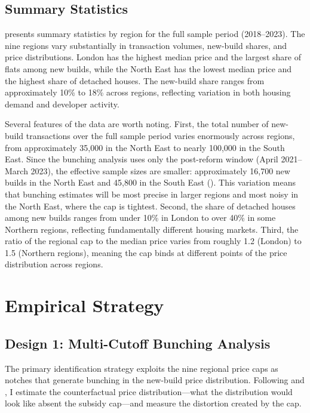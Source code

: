 \documentclass[12pt]{article}
\begin{document}
\subsection{Summary Statistics}



 presents summary statistics by region for the full sample period (2018--2023). The nine regions vary substantially in transaction volumes, new-build shares, and price distributions. London has the highest median price and the largest share of flats among new builds, while the North East has the lowest median price and the highest share of detached houses. The new-build share ranges from approximately 10\% to 18\% across regions, reflecting variation in both housing demand and developer activity.

Several features of the data are worth noting. First, the total number of new-build transactions over the full sample period varies enormously across regions, from approximately 35,000 in the North East to nearly 100,000 in the South East. Since the bunching analysis uses only the post-reform window (April 2021--March 2023), the effective sample sizes are smaller: approximately 16,700 new builds in the North East and 45,800 in the South East (). This variation means that bunching estimates will be most precise in larger regions and most noisy in the North East, where the cap is tightest. Second, the share of detached houses among new builds ranges from under 10\% in London to over 40\% in some Northern regions, reflecting fundamentally different housing markets. Third, the ratio of the regional cap to the median price varies from roughly 1.2 (London) to 1.5 (Northern regions), meaning the cap binds at different points of the price distribution across regions.


\section{Empirical Strategy}\label{sec:strategy}

\subsection{Design 1: Multi-Cutoff Bunching Analysis}

The primary identification strategy exploits the nine regional price caps as notches that generate bunching in the new-build price distribution. Following \citet{kleven2016bunching} and \citet{best2018housing}, I estimate the counterfactual price distribution---what the distribution would look like absent the subsidy cap---and measure the distortion created by the cap.
\end{document}
